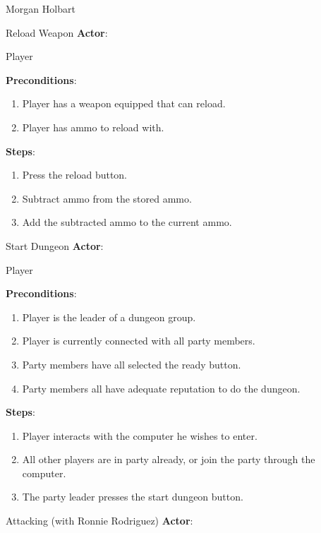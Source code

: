 \documentclass[12pt]{report}
\begin{document}
\begin{section}{Morgan Holbart}
\begin{subsection}{Reload Weapon}
\textbf{Actor}:

Player

\textbf{Preconditions}:
 
\begin{enumerate}
\item Player has a weapon equipped that can reload.
\item Player has ammo to reload with.
\end{enumerate}

\textbf{Steps}:

\begin{enumerate}
\item Press the reload button.
\item Subtract ammo from the stored ammo.
\item Add the subtracted ammo to the current ammo.
\end{enumerate}
\end{subsection}

\begin{subsection}{Start Dungeon}
\textbf{Actor}:

Player

\textbf{Preconditions}:

\begin{enumerate}
\item Player is the leader of a dungeon group.
\item Player is currently connected with all party members.
\item Party members have all selected the ready button.
\item Party members all have adequate reputation to do the dungeon.
\end{enumerate}

\textbf{Steps}:

\begin{enumerate}
\item Player interacts with the computer he wishes to enter.
\item All other players are in party already, or join the party through the
computer.
\item The party leader presses the start dungeon button.
\end{enumerate}
\end{subsection}

\begin{subsection}{Attacking (with Ronnie Rodriguez)}
\textbf{Actor}:


\end{subsection}
\end{section}
\end{document}
